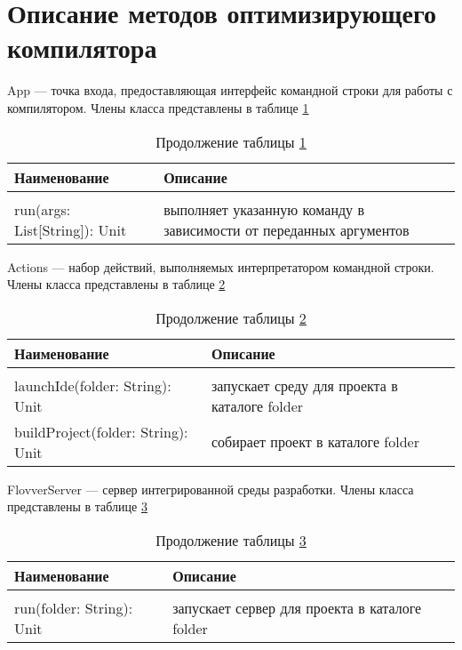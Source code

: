 \section{Описание методов оптимизирующего компилятора}\label{sec:ch3/sect4}

App --- точка входа, предоставляющая интерфейс командной строки для работы с компилятором. Члены класса представлены в таблице \ref{tab:class15}

\begin{longtable} {| p{8.3cm} | p{8.35cm}l |}
	\caption{Члены класса App}
	\label{tab:class15}\\
	\hline
	\centering Наименование &  \centering Описание & \\
	\hline
	\endfirsthead
	\caption*{Продолжение таблицы \ref{tab:class15}}\\
	\hline
	\endhead
	\hline
	\endfoot
	run(args: List[String]): Unit & выполняет указанную команду в зависимости от переданных аргументов & \\
\end{longtable}

Actions --- набор действий, выполняемых интерпретатором командной строки. Члены класса представлены в таблице \ref{tab:class16}

\begin{longtable} {| p{8.3cm} | p{8.35cm}l |}
	\caption{Члены класса Actions}
	\label{tab:class16}\\
	\hline
	\centering Наименование &  \centering Описание & \\
	\hline
	\endfirsthead
	\caption*{Продолжение таблицы \ref{tab:class16}}\\
	\hline
	\endhead
	\hline
	\endfoot
	launchIde(folder: String): Unit & запускает среду для проекта в каталоге folder & \\
	\hline
	buildProject(folder: String): Unit & собирает проект в каталоге folder & \\
\end{longtable}

FlovverServer --- сервер интегрированной среды разработки. Члены класса представлены в таблице \ref{tab:class17}

\begin{longtable} {| p{8.3cm} | p{8.35cm}l |}
	\caption{Члены класса FlovverServer}
	\label{tab:class17}\\
	\hline
	\centering Наименование &  \centering Описание & \\
	\hline
	\endfirsthead
	\caption*{Продолжение таблицы \ref{tab:class17}}\\
	\hline
	\endhead
	\hline
	\endfoot
	run(folder: String): Unit & запускает сервер для проекта в каталоге folder & \\
\end{longtable}

